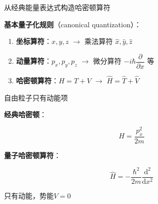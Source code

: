 
\begin{frame}{从经典能量表达式构造哈密顿算符}

  
    \begin{iqbitemize}
    \item \textbf{基本量子化规则}（canonical quantization）：
    \end{iqbitemize}
    \begin{enumerate}
      \item \textbf{坐标算符}：$x, y, z$ $\rightarrow$ 乘法算符 $\hat{x}, \hat{y}, \hat{z}$
      \item \textbf{动量算符}：$p_x, p_y, p_z$ $\rightarrow$ 微分算符 $-i\hbar\dfrac{\partial}{\partial x}$ 等
      \item \textbf{哈密顿算符}：$H = T + V$ $\rightarrow$ $\hat{H} = \hat{T} + \hat{V}$
    \end{enumerate}

    \iqbsmallsep

    \end{frame}

\begin{frame}{自由粒子只有动能项}

  
    \begin{iqbitemize}
    \item \textbf{经典哈密顿}：
    \end{iqbitemize}
    \[
      H = \dfrac{p_x^2}{2m}
    \]
    \begin{iqbitemize}
    \item \textbf{量子哈密顿算符}：
    \end{iqbitemize}
    \[
      \hat{H} = -\dfrac{\hbar^2}{2m}\dfrac{\mathrm{d}^2}{\mathrm{d}x^2}
    \]
    \begin{iqbitemize}
    \item 只有动能，势能$V = 0$
    \end{iqbitemize}

    \iqbsmallsep

    \end{frame}

